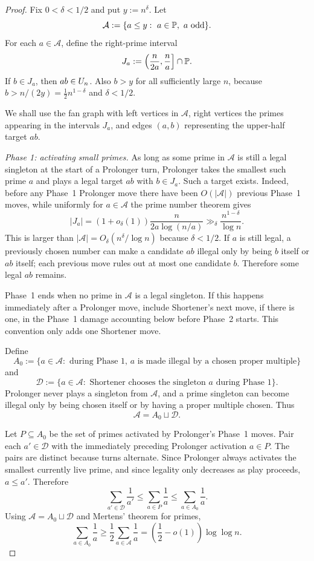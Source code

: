 \begin{proof}
Fix $0<\delta<1/2$ and put $y:=n^\delta$.  Let
\[
  \mathcal A:=\{a\le y:\ a\in\PP,\ a\text{ odd}\}.
\]
For each $a\in\mathcal A$, define the right-prime interval
\[
  J_a:=\left(\frac{n}{2a},\frac na\right]\cap\mathbb{P}.
\]
If $b\in J_a$, then $ab\in U_n$.  Also $b>y$ for all sufficiently large $n$,
because $b>n/(2y)=\frac12n^{1-\delta}$ and $\delta<1/2$.

We shall use the fan graph with left vertices in $\mathcal A$, right vertices
the primes appearing in the intervals $J_a$, and edges $(a,b)$ representing the
upper-half target $ab$.

\smallskip
\noindent\emph{Phase 1: activating small primes.}
As long as some prime in $\mathcal A$ is still a legal singleton at the start
of a Prolonger turn, Prolonger takes the smallest such prime $a$ and plays a
legal target $ab$ with $b\in J_a$.  Such a target exists.  Indeed, before any
Phase~1 Prolonger move there have been $O(|\mathcal A|)$ previous Phase~1
moves, while uniformly for $a\in\mathcal A$ the prime number theorem gives
\[
  |J_a|
  =
  (1+o_\delta(1))\frac{n}{2a\log(n/a)}
  \gg_\delta
  \frac{n^{1-\delta}}{\log n}.
\]
This is larger than $|\mathcal A|=O_\delta(n^\delta/\log n)$ because
$\delta<1/2$.  If $a$ is still legal, a previously chosen number can make a
candidate $ab$ illegal only by being $b$ itself or $ab$ itself; each previous
move rules out at most one candidate $b$.  Therefore some legal $ab$ remains.

Phase~1 ends when no prime in $\mathcal A$ is a legal singleton.  If this
happens immediately after a Prolonger move, include Shortener's next move, if
there is one, in the Phase~1 damage accounting below before Phase~2 starts.
This convention only adds one Shortener move.

Define
\[
  A_0:=\{a\in\mathcal A:\text{ during Phase~1, }a\text{ is made illegal by a
  chosen proper multiple}\}
\]
and
\[
  \mathcal D:=\{a\in\mathcal A:\text{ Shortener chooses the singleton }a
  \text{ during Phase~1}\}.
\]
Prolonger never plays a singleton from $\mathcal A$, and a prime singleton can
become illegal only by being chosen itself or by having a proper multiple
chosen.  Thus
\[
  \mathcal A=A_0\sqcup\mathcal D.
\]

Let $P\subseteq A_0$ be the set of primes activated by Prolonger's Phase~1
moves.  Pair each $a'\in\mathcal D$ with the immediately preceding Prolonger
activation $a\in P$.  The pairs are distinct because turns alternate.  Since
Prolonger always activates the smallest currently live prime, and since
legality only decreases as play proceeds, $a\le a'$.  Therefore
\[
  \sum_{a'\in\mathcal D}\frac1{a'}
  \le
  \sum_{a\in P}\frac1a
  \le
  \sum_{a\in A_0}\frac1a.
\]
Using $\mathcal A=A_0\sqcup\mathcal D$ and Mertens' theorem for primes,
\[
  \sum_{a\in A_0}\frac1a
  \ge
  \frac12\sum_{a\in\mathcal A}\frac1a
  =
  \left(\frac12-o(1)\right)\log\log n.
  \tag{4.5}\label{eq:fan-A0-mass}
\]


\end{proof}

